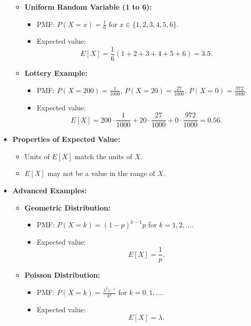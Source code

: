 \documentclass{article}
\begin{document}
\begin{itemize}
\begin{itemize}
      \item \textbf{Uniform Random Variable (1 to 6):}
        \begin{itemize}
          \item PMF: $P(X = x) = \frac{1}{6}$ for $x \in \{1, 2, 3, 4, 5, 6\}$.
          \item Expected value:
            \[
              E[X] = \frac{1}{6}(1 + 2 + 3 + 4 + 5 + 6) = 3.5.
            \]
        \end{itemize}

      \item \textbf{Lottery Example:}
        \begin{itemize}
          \item PMF: $P(X = 200) = \frac{1}{1000}$, $P(X = 20) = \frac{27}{1000}$, $P(X = 0) = \frac{972}{1000}$.
          \item Expected value:
            \[
              E[X] = 200 \cdot \frac{1}{1000} + 20 \cdot \frac{27}{1000} + 0 \cdot \frac{972}{1000} = 0.56.
            \]
        \end{itemize}
    \end{itemize}

  \item \textbf{Properties of Expected Value:}
    \begin{itemize}
      \item Units of $E[X]$ match the units of $X$.
      \item $E[X]$ may not be a value in the range of $X$.
    \end{itemize}

  \item \textbf{Advanced Examples:}
    \begin{itemize}
      \item \textbf{Geometric Distribution:}
        \begin{itemize}
          \item PMF: $P(X = k) = (1 - p)^{k-1}p$ for $k = 1, 2, \dots$.
          \item Expected value:
            \[
              E[X] = \frac{1}{p}.
            \]
        \end{itemize}

      \item \textbf{Poisson Distribution:}
        \begin{itemize}
          \item PMF: $P(X = k) = \frac{\lambda^k e^{-\lambda}}{k!}$ for $k = 0, 1, \dots$.
          \item Expected value:
            \[
              E[X] = \lambda.
            \]
        \end{itemize}


\end{itemize}
\end{itemize}
\end{document}
